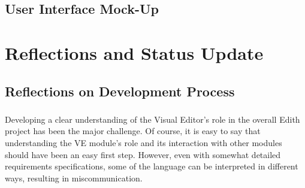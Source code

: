 \documentclass{llncs}
\begin{document}
\clearpage

\subsection{User Interface Mock-Up}
\subsubsection{}
\noindent{}

\clearpage

\section{Reflections and Status Update}

\subsection{Reflections on Development Process}
\subsubsection{}
Developing a clear understanding of the Visual Editor’s role in the overall Edith project has been the major challenge.   Of course, it is easy to say that understanding the VE module’s role and its interaction with other modules should have been an easy first step.  However, even with somewhat detailed requirements specifications, some of the language can be interpreted in different ways, resulting in miscommunication.  
\end{document}

